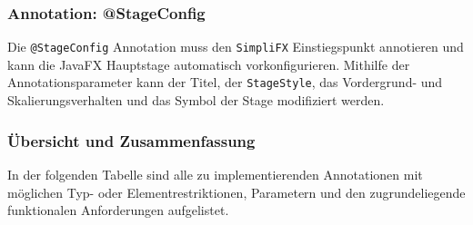 \subsubsection{Annotation: @StageConfig}
Die \texttt{@StageConfig} Annotation muss den \texttt{SimpliFX} Einstiegspunkt annotieren und kann die JavaFX Hauptstage automatisch vorkonfigurieren. Mithilfe der Annotationsparameter kann der Titel, der \texttt{StageStyle}, das Vordergrund- und Skalierungsverhalten und das Symbol der Stage modifiziert werden.
\subsubsection{Übersicht und Zusammenfassung}
In der folgenden Tabelle sind alle zu implementierenden Annotationen mit möglichen Typ- oder Elementrestriktionen, Parametern und den zugrundeliegende funktionalen Anforderungen aufgelistet.
